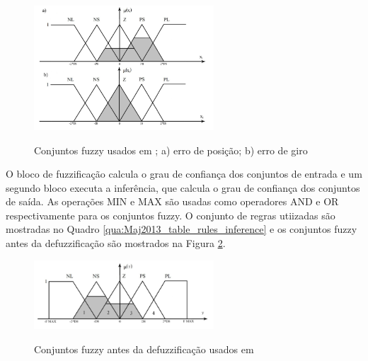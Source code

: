 \begin{figure}[!htb]
    \centering
    \caption{Conjuntos fuzzy usados em \cite{Maj2013}; a) erro de posição; b) erro de giro }
    \includegraphics[width=0.6\textwidth]{./04-figuras/Maj2013_fuzzy_sets}
    \label{fig:Maj2013_fuzzy_sets}
\end{figure}

O bloco de fuzzificação calcula o grau de confiança dos conjuntos de entrada e um segundo bloco executa a inferência, que calcula o grau de confiança dos conjuntos de saída. As operações MIN e MAX são usadas como operadores AND e OR respectivamente para os conjuntos fuzzy. O conjunto de regras utiizadas são mostradas no Quadro \ref{qua:Maj2013_table_rules_inference} e os conjuntos fuzzy antes da defuzzificação são mostrados na Figura \ref{fig:Maj2013_fuzzy_sets_output}.



\begin{figure}[!htb]
    \centering
    \caption{Conjuntos fuzzy antes da defuzzificação usados em \cite{Maj2013} }
    \includegraphics[width=0.6\textwidth]{./04-figuras/Maj2013_fuzzy_sets_output}
    \label{fig:Maj2013_fuzzy_sets_output}
\end{figure}

